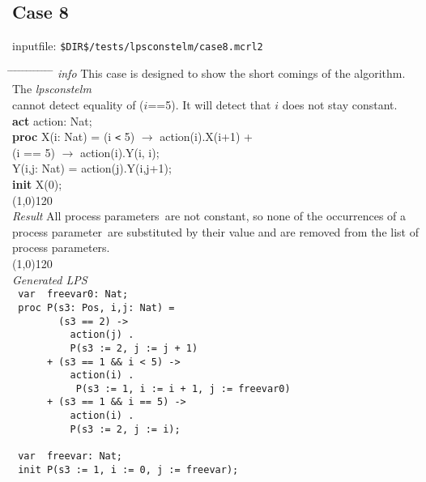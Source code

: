 \index{}\documentclass[a4paper,10pt]{article}
\theoremstyle{plain}
\theoremstyle{definition}
\newcommand{\tool}{\textit{lpsconstelm}}
\newcommand{\pp}{process parameter}
\newcommand{\pps}{process parameters}
\newcommand{\ti}{\textit}
\newcommand{\tb}{\textbf}
\newcommand{\tabw}{\hspace*{15.mm} \= \hspace*{20.mm} \= \hspace*{5.mm} \= \hspace*{5.mm} \= \hspace*{5.mm} \= \hspace*{5.mm}  \= \hspace*{5.mm}  \= \hspace*{5.mm}  \= \hspace*{5.mm} \= \hspace*{5.mm} \= \hspace*{5.mm}  \= \hspace*{5.mm}  \= \hspace*{5.mm}\kill}
\begin{document}
\subsection*{Case 8}
inputfile: \verb"$DIR$/tests/lpsconstelm/case8.mcrl2"
\begin{tabbing}
\tabw
\ti{info} \> This case is designed to show the short comings of the algorithm. The \tool \ \\
	\> cannot detect equality of ($i$==5). It will detect that $i$ does not stay constant. \\
\tb{act} \> action: Nat;\\
\tb{proc} \> X(i: Nat)   = \>  (i \verb"<"  5) $\rightarrow$ action(i).X(i+1) +\\
           \>        \> (i == 5) $\rightarrow$ action(i).Y(i, i);\\
    \>  Y(i,j: Nat) = \>  action(j).Y(i,j+1);               \\
\tb{init} X(0);\\
\line(1,0){120}\\
\ti{Result} \> All \pps\ are not constant, so none of the occurrences of a \\
\> \pp\ are substituted by their value and are removed from the list of \\
\> \pps.\\
\line(1,0){120}\\
\ti{Generated LPS} \\
\>  \verb" var  freevar0: Nat;"                              \\      %
\>  \verb" proc P(s3: Pos, i,j: Nat) = "                       \\    %
\>  \verb"        (s3 == 2) ->        "                        \\    %
\>  \verb"          action(j) .     "                          \\    %
\>  \verb"          P(s3 := 2, j := j + 1)"                    \\    %
\>  \verb"      + (s3 == 1 && i < 5) ->"                       \\    %
\>  \verb"          action(i) . "                              \\    %
\>  \verb"           P(s3 := 1, i := i + 1, j := freevar0) "   \\    %
\>  \verb"      + (s3 == 1 && i == 5) -> "                     \\    %
\>  \verb"          action(i) .       "                        \\    %
\>  \verb"          P(s3 := 2, j := i);"                       \\    %
\>  \verb"                            "                        \\    %
\>  \verb" var  freevar: Nat;      "                           \\    %
\>  \verb" init P(s3 := 1, i := 0, j := freevar);"             \\    %
\end{tabbing}
\end{document}
